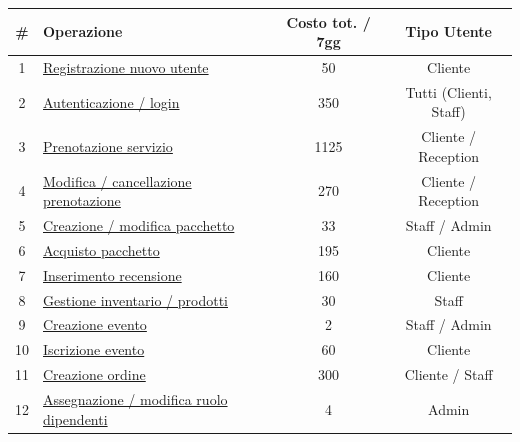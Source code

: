 \documentclass[a4paper,12pt]{report}
\begin{document}
\begin{table}[H]
	\centering
	\small
	\renewcommand{\arraystretch}{1.12}
	\begin{tabularx}{\textwidth}{|c|>{\raggedright\arraybackslash}X|c|c|}
		\hline
		\rowcolor{gray!20}
		\textbf{\#} & \textbf{Operazione}                                                    & \textbf{Costo tot. / 7gg} & \textbf{Tipo Utente}   \\
		\hline
		1           & \hyperref[op1]{Registrazione nuovo utente}                             & 50                        & Cliente                \\
		\hline
		2           & \hyperref[op2]{Autenticazione / login}                                 & 350                       & Tutti (Clienti, Staff) \\
		\hline
		3           & \hyperref[op3]{Prenotazione servizio}                                  & 1125                      & Cliente / Reception    \\
		\hline
		4           & \hyperref[op4]{Modifica / cancellazione prenotazione}                  & 270                       & Cliente / Reception    \\
		\hline
		5           & \hyperref[op5]{Creazione / modifica pacchetto}                         & 33                        & Staff / Admin          \\
		\hline
		6           & \hyperref[op6]{Acquisto pacchetto}                                     & 195                       & Cliente                \\
		\hline
		7           & \hyperref[op7]{Inserimento recensione}                                 & 160                       & Cliente                \\
		\hline
		8           & \hyperref[op8]{Gestione inventario / prodotti}                         & 30                        & Staff                  \\
		\hline
		9           & \hyperref[op9]{Creazione evento}                                       & 2                         & Staff / Admin          \\
		\hline
		10          & \hyperref[op10]{Iscrizione evento}                                     & 60                        & Cliente                \\
		\hline
		11          & \hyperref[op11]{Creazione ordine}                                      & 300                       & Cliente / Staff        \\
		\hline
		12          & \hyperref[op12]{Assegnazione / modifica ruolo dipendenti}              & 4                         & Admin                  \\

\end{tabularx}
\end{table}
\end{document}
